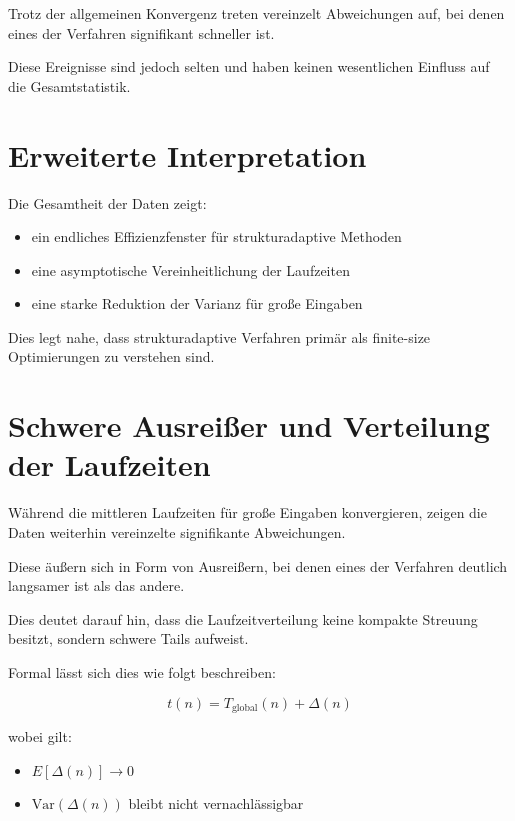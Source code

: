 \documentclass[11pt,a4paper]{article}
\begin{document}
	Trotz der allgemeinen Konvergenz treten vereinzelt Abweichungen auf, bei denen eines der Verfahren signifikant schneller ist.
	
	Diese Ereignisse sind jedoch selten und haben keinen wesentlichen Einfluss auf die Gesamtstatistik.
	
	\section{Erweiterte Interpretation}
	
	Die Gesamtheit der Daten zeigt:
	
	\begin{itemize}
		\item ein endliches Effizienzfenster für strukturadaptive Methoden
		\item eine asymptotische Vereinheitlichung der Laufzeiten
		\item eine starke Reduktion der Varianz für große Eingaben
	\end{itemize}
	
	Dies legt nahe, dass strukturadaptive Verfahren primär als finite-size Optimierungen zu verstehen sind.
	
	
\section{Schwere Ausreißer und Verteilung der Laufzeiten}

Während die mittleren Laufzeiten für große Eingaben konvergieren, zeigen die Daten weiterhin vereinzelte signifikante Abweichungen.

Diese äußern sich in Form von Ausreißern, bei denen eines der Verfahren deutlich langsamer ist als das andere.

Dies deutet darauf hin, dass die Laufzeitverteilung keine kompakte Streuung besitzt, sondern schwere Tails aufweist.

Formal lässt sich dies wie folgt beschreiben:

\begin{equation}
	t(n) = T_{\text{global}}(n) + \Delta(n)
\end{equation}

wobei gilt:

\begin{itemize}
	\item $E[\Delta(n)] \to 0$
	\item $\mathrm{Var}(\Delta(n))$ bleibt nicht vernachlässigbar
\end{itemize}
\end{document}

